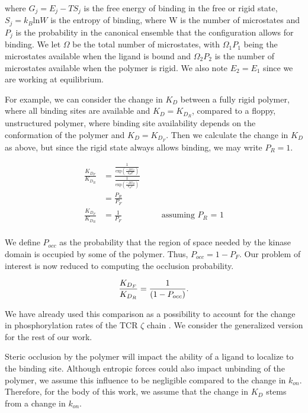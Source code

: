 \documentclass[../AdvancementSummary.tex]{subfiles}
\begin{document}
where $G_j=E_j-TS_j$ is the free energy of binding in the free or rigid state, $S_j = k_B \mbox{ln} W$ is the entropy of binding, where W is the number of microstates and $P_j$ is the probability in the canonical ensemble that the configuration allows for binding. We let $\Omega$ be the total number of microstates, with $\Omega_1 P_1$ being the microstates available when the ligand is bound and $\Omega_2 P_2$ is the number of microstates available when the polymer is rigid. We also note $E_2 = E_1$ since we are working at equilibrium. 

For example, we can consider the change in $K_D$ between a fully rigid polymer, where all binding sites are available and $K_D = K_{D_R}$, compared to a floppy, unstructured polymer, where binding site availability depends on the conformation of the polymer and $K_D = K_{D_F}$. Then we calculate the change in $K_D$ as above, but since the rigid state always allows binding, we may write $P_R =1$. 

\begin{align} 
\frac{K_{D_F}}{K_{D_R}}  &= \frac{\frac{1}{\mbox{exp} \left( \frac{-\Delta G_F}{k_B T}\right) }}{\frac{1}{\mbox{exp} \left( \frac{-\Delta G_R}{k_B T}\right)}} \\ 
&= \frac{P_R}{P_F}\\
\frac{K_{D_F}}{K_{D_R}} &=\frac{1}{P_F} \hspace{2cm} \text{assuming $P_R$ = 1} \\
\end{align}  

We define $P_{occ}$ as the probability that the region of space needed by the kinase domain is occupied by some of the polymer. Thus, $P_{occ}=1-P_F$. Our problem of interest is now reduced to computing the occlusion probability. 

\begin{equation}
\frac{K_{D_F}}{K_{D_R}} = \frac{1}{(1-P_{occ})}. \\
\end{equation}

We have already used this comparison as a possibility to account for the change in phosphorylation rates of the TCR $\zeta$ chain \cite{Mukhopadhyay2016}. We consider the generalized version for the rest of our work. 

Steric occlusion by the polymer will impact the ability of a ligand to localize to the binding site. Although entropic forces could also impact unbinding of the polymer, we assume this influence to be negligible compared to the change in $k_{on}$. Therefore, for the body of this work, we assume that the change in $K_D$ stems from a change in $k_{on}$.
\end{document}
